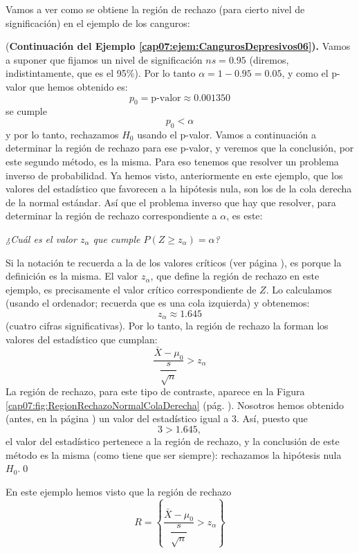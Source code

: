 Vamos a ver como se obtiene la región de rechazo (para cierto nivel de significación) en el ejemplo de los canguros:
\begin{ejemplo}{(\bf Continuación del Ejemplo \ref{cap07:ejem:CangurosDepresivos06}).}
\label{cap07:ejem:CangurosDepresivos07}
    Vamos a suponer que fijamos un nivel de significación $ns=0.95$ (diremos, indistintamente, que es el 95\%). Por lo tanto $\alpha=1-0.95=0.05$, y como el p-valor que hemos obtenido es:
    \[p_0=\mbox{p-valor}\approx 0.001350\]
    se cumple
    \[p_0<\alpha\]
    y por lo tanto, rechazamos $H_0$ usando el p-valor. Vamos a continuación a determinar la región de rechazo para ese p-valor, y veremos que la conclusión, por este segundo método, es la misma. Para eso tenemos que resolver un problema inverso de probabilidad. Ya hemos visto, anteriormente en este ejemplo, que los valores del estadístico que favorecen a la hipótesis nula, son los de la cola derecha de la normal estándar. Así que el problema inverso que hay que resolver, para determinar la región de rechazo correspondiente a $\alpha$,  es este:
    \begin{center}
    {\em ¿Cuál es el valor $z_{\alpha}$ que cumple $P(Z\geq z_{\alpha})=\alpha$?}
    \end{center}
    Si la notación te recuerda a la de los valores críticos (ver página \pageref{cap06:ecu:DefinicionValorCriticoZ}), es porque la definición es la misma. El valor $z_{\alpha}$, que define la región de rechazo en este ejemplo, es precisamente el valor crítico correspondiente de $Z$. Lo calculamos (usando el ordenador; recuerda que es una cola izquierda) y obtenemos:
    \[z_{\alpha}\approx 1.645\]
    (cuatro cifras significativas). Por lo tanto, la región de rechazo la forman los valores del estadístico que cumplan:
    \[\dfrac{\bar X-\mu_0}{\dfrac{s}{\sqrt{n}}} > z_{\alpha}\]
    La región de rechazo, para este tipo de contraste, aparece en la Figura \ref{cap07:fig:RegionRechazoNormalColaDerecha} (pág. \pageref{cap07:fig:RegionRechazoNormalColaDerecha}).
    Nosotros hemos obtenido (antes, en la página \pageref{cap07:ejem:CangurosDepresivos04}) un valor del estadístico igual a $3$. Así,  puesto que
    \[3 > 1.645,\]
    el valor del estadístico pertenece a la región de rechazo, y la conclusión de este método es la misma (como tiene que ser siempre): rechazamos la hipótesis nula $H_0$.\qed
\end{ejemplo}
En este ejemplo hemos visto que la región de rechazo
\begin{equation}
\label{cap07:ecu:RegionRechazoMediaZColaDerecha}
R=\left\{\dfrac{\bar X-\mu_0}{\dfrac{s}{\sqrt{n}}} > z_{\alpha}\right\}
\end{equation}
